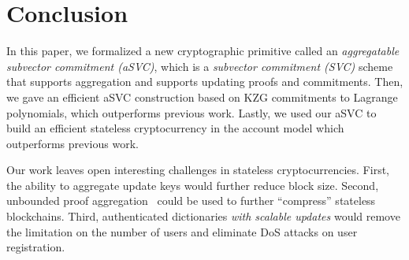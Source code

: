 \section{Conclusion}
In this paper, we formalized a new cryptographic primitive called an \textit{aggregatable subvector commitment (aSVC)}, which is a \textit{subvector commitment (SVC)} scheme that supports aggregation and supports updating proofs and commitments.
Then, we gave an efficient aSVC construction based on KZG commitments to Lagrange polynomials, which outperforms previous work.
Lastly, we used our aSVC to build an efficient stateless cryptocurrency in the account model which outperforms previous work.

Our work leaves open interesting challenges in stateless cryptocurrencies.
First, the ability to aggregate update keys would further reduce block size.
Second, unbounded proof aggregation~\cite{CFG+20} could be used to further ``compress'' stateless blockchains.
Third, authenticated dictionaries \textit{with scalable updates} would remove the limitation on the number of users and eliminate DoS attacks on user registration.